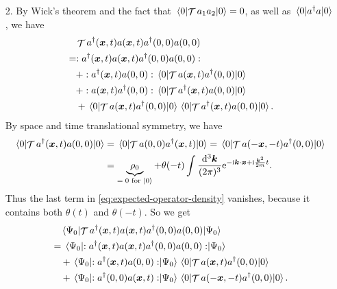 \documentclass[hyperref, a4paper]{article}
\DeclareMathOperator{\timeorder}{\mathcal{T}}
\newcommand*{\ii}{\mathrm{i}}
\newcommand*{\ee}{\mathrm{e}}
\newcommand*{\normalorder}[1]{: #1 :}
\begin{document}
\begin{enumerate}
\item[2.] By Wick's theorem and the fact that $\expval{\timeorder a_1 a_2}{0} = 0$,
as well as $\expval{a^\dagger a}{0}$, 
we have 
\begin{equation}
    \begin{aligned}
        &\quad \timeorder a^\dagger(\vb*{x}, t) a(\vb*{x}, t) a^\dagger(0, 0) a(0, 0) \\
        &= \normalorder{a^\dagger(\vb*{x}, t) a(\vb*{x}, t) a^\dagger(0, 0) a(0, 0)} \\
        &\quad + \normalorder{a^\dagger(\vb*{x}, t) a(0, 0)} 
        \expval{\timeorder a(\vb*{x}, t) a^\dagger(0, 0) }{0} \\
        &\quad + \normalorder{a(\vb*{x}, t) a^\dagger(0, 0)} 
        \expval{\timeorder a^\dagger (\vb*{x}, t) a(0, 0)}{0} \\
        &\quad + \expval{\timeorder a(\vb*{x}, t) a^\dagger(0, 0) }{0}
        \expval{\timeorder a^\dagger (\vb*{x}, t) a(0, 0)}{0}.
    \end{aligned}
    \label{eq:expected-operator-density}
\end{equation}
By space and time translational symmetry, we have 
\[
    \begin{aligned}
        \expval{\timeorder a^\dagger (\vb*{x}, t) a(0, 0)}{0}
        &= \expval{\timeorder a(0, 0) a^\dagger (\vb*{x}, t)}{0} 
        = \expval{\timeorder a(- \vb*{x}, -t) a^\dagger (0, 0)}{0}  \\
        &= \underbrace{\rho_0}_{\text{$=0$ for $\ket{0}$}} +
        \theta(-t) \int \frac{\dd[3]{\vb*{k}}}{(2\pi)^3} \ee^{- \ii \vb*{k} \cdot \vb*{x} + \ii \frac{\vb*{k}^2}{2m} t }.
    \end{aligned}
\]
Thus the last term in \eqref{eq:expected-operator-density} vanishes,
because it contains both $\theta(t)$ and $\theta(-t)$.
So we get 
\begin{equation}
    \begin{aligned}
        &\quad \expval{\timeorder a^\dagger(\vb*{x}, t) a(\vb*{x}, t) a^\dagger(0, 0) a(0, 0)}{\Psi_0} \\
        &= \expval{\normalorder{a^\dagger(\vb*{x}, t) a(\vb*{x}, t) a^\dagger(0, 0) a(0, 0)}}{\Psi_0} \\
        &\quad + \expval{\normalorder{a^\dagger(\vb*{x}, t) a(0, 0)}}{\Psi_0} 
        \expval{\timeorder a(\vb*{x}, t) a^\dagger(0, 0) }{0} \\
        &\quad + \expval{\normalorder{a^\dagger(0, 0) a(\vb*{x}, t)} }{\Psi_0}
        \expval{\timeorder a(-\vb*{x}, -t) a^\dagger(0, 0)}{0} .

\end{aligned}
\end{equation}
\end{enumerate}
\end{document}
